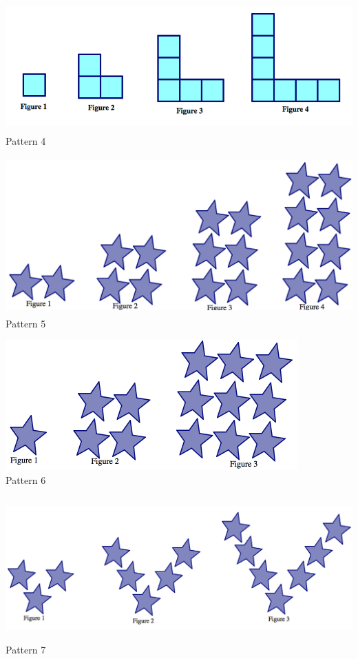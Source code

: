 \documentclass[12pt, reqno]{amsart}
\theoremstyle{remark}
\theoremstyle{definition}
\numberwithin{equation}{section}  %
\begin{document}
\begin{center}
\bigskip

\includegraphics[height=5cm]{matching4}\\
Pattern 4

\bigskip

\includegraphics[height=6cm]{matching5}\\
Pattern 5

\bigskip

\includegraphics[height=5cm]{matching6}\\
Pattern 6

\bigskip

\includegraphics[height=5.5cm]{matching7}\\
Pattern 7


\end{center}
\end{document}
